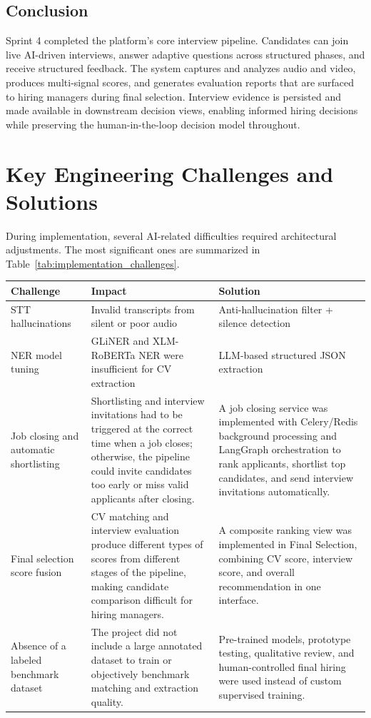 \subsection{Conclusion}
Sprint 4 completed the platform's core interview pipeline. Candidates can join live AI-driven interviews, answer adaptive questions across structured phases, and receive structured feedback. The system captures and analyzes audio and video, produces multi-signal scores, and generates evaluation reports that are surfaced to hiring managers during final selection. Interview evidence is persisted and made available in downstream decision views, enabling informed hiring decisions while preserving the human-in-the-loop decision model throughout.

\section{ Key Engineering Challenges and Solutions}
During implementation, several AI-related difficulties required architectural adjustments. The most significant ones are summarized in Table~\ref{tab:implementation_challenges}.
\begin{center}
\label{tab:implementation_challenges}
\renewcommand{\arraystretch}{1.2}
\begin{tabularx}{\textwidth}{|l|X|X|}
\hline
\rowcolor{gray!20}
\textbf{Challenge} & \textbf{Impact} & \textbf{Solution} \\
\hline
STT hallucinations & Invalid transcripts from silent or poor audio & Anti-hallucination filter + silence detection \\
\hline
NER model tuning & GLiNER and XLM-RoBERTa NER were insufficient for CV extraction & LLM-based structured JSON extraction \\
\hline

Job closing and automatic shortlisting &
Shortlisting and interview invitations had to be triggered at the correct time when a job closes; otherwise, the pipeline could invite candidates too early or miss valid applicants after closing. &
A job closing service was implemented with Celery/Redis background processing and LangGraph orchestration to rank applicants, shortlist top candidates, and send interview invitations automatically. \\
\hline
Final selection score fusion &
CV matching and interview evaluation produce different types of scores from different stages of the pipeline, making candidate comparison difficult for hiring managers. &
A composite ranking view was implemented in Final Selection, combining CV score, interview score, and overall recommendation in one interface. \\
\hline
Absence of a labeled benchmark dataset &
The project did not include a large annotated dataset to train or objectively benchmark matching and extraction quality. &
Pre-trained models, prototype testing, qualitative review, and human-controlled final hiring were used instead of custom supervised training. \\
\hline

\end{tabularx}
\end{center}

